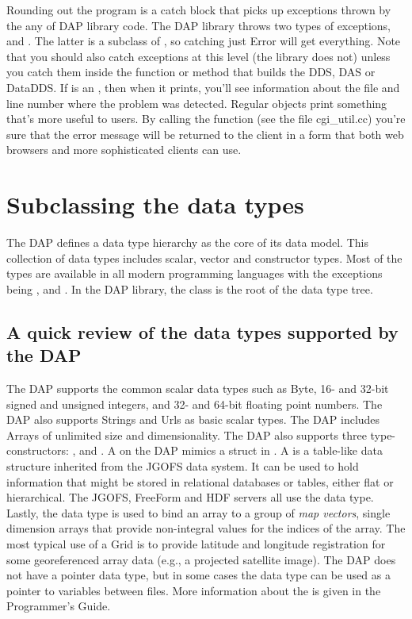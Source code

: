 \documentclass{dods-paper}
\begin{document}
Rounding out the program is a catch block that picks up exceptions thrown by
the any of DAP library code. The DAP library throws two types of exceptions,
 and . The latter is a subclass of ,
so catching just Error will get everything. Note that you should also catch
 exceptions at this level (the library does not) unless you
catch them inside the function or method that builds the DDS, DAS or DataDDS.
If  is an , then when it prints, you'll see
information about the file and line number where the problem was detected.
Regular  objects print something that's more useful to users. By
calling the  function (see the file cgi\_util.cc) you're
sure that the error message will be returned to the client in a form that
both web browsers and more sophisticated clients can use.

\section{Subclassing the data types}

The DAP defines a data type hierarchy as the core of its data model. This
collection of data types includes scalar, vector and constructor types. Most
of the types are available in all modern programming languages with the
exceptions being ,  and . In the DAP
library, the class  is the root of the data type tree.


\subsection{A quick review of the data types supported by the DAP}

The DAP supports the common scalar data types such as Byte, 16- and 32-bit
signed and unsigned integers, and 32- and 64-bit floating point numbers. The
DAP also supports Strings and Urls as basic scalar types. The DAP includes
Arrays of unlimited size and dimensionality. The DAP also supports three
type-constructors: ,  and . A
 on the DAP mimics a struct in . A  is a
table-like data structure inherited from the JGOFS data system. It can be
used to hold information that might be stored in relational databases or
tables, either flat or hierarchical. The JGOFS, FreeForm and HDF servers all
use the  data type. Lastly, the  data type is used to
bind an array to a group of \emph{map vectors}, single dimension arrays that
provide non-integral values for the indices of the array. The most typical
use of a Grid is to provide latitude and longitude registration for some
georeferenced array data (e.g., a projected satellite image). The DAP does
not have a pointer data type, but in some cases the  data type can
be used as a pointer to variables between files. More information about the
is given in the Programmer's Guide.
\end{document}
